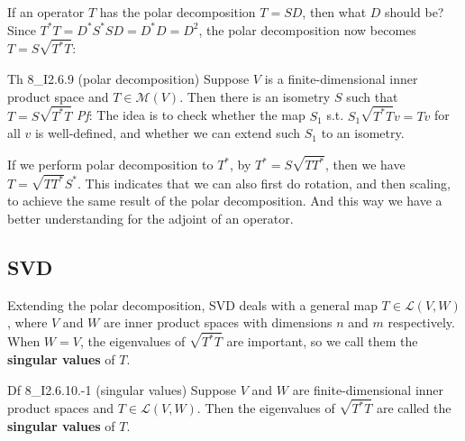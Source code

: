 \documentclass{article}
\begin{document}
If an operator $T$ has the polar decomposition $T = SD$, then what $D$ should be? Since $T^\ast T = D^\ast S^\ast S D = D^\ast D = D^2$, the polar decomposition now becomes $T = S\sqrt{T^\ast T}$:

\begin{Th}{Th 8\_I2.6.9 (polar decomposition)}
    Suppose $V$ is a finite-dimensional inner product space and $T\in\mathcal{M}(V)$. Then there is an isometry $S$ such that
    $T = S\sqrt{T^\ast T}$
    \tcblower
    \textit{Pf}: The idea is to check whether the map $S_1$ s.t. $S_1\sqrt{T^\ast T}v = Tv$ for all $v$ is well-defined, and whether we can extend such $S_1$ to an isometry.
\end{Th}

If we perform polar decomposition to $T^\ast$, by $T^\ast = S\sqrt{TT^\ast}$, then we have $T = \sqrt{TT^\ast} S^\ast$. This indicates that we can also first do rotation, and then scaling, to achieve the same result of the polar decomposition. And this way we have a better understanding for the adjoint of an operator.

\subsection{SVD}
Extending the polar decomposition, SVD deals with a general map $T\in\mathcal{L}(V,W)$, where $V$ and $W$ are inner product spaces with dimensions $n$ and $m$ respectively. When $W = V$, the eigenvalues of $\sqrt{T^\ast T}$ are important, so we call them the \textbf{singular values} of $T$.

\begin{Df}{Df 8\_I2.6.10.-1 (singular values)}
    Suppose $V$ and $W$ are finite-dimensional inner product spaces and $T\in\mathcal{L}(V,W)$. Then the eigenvalues of $\sqrt{T^\ast T}$ are called the \textbf{singular values} of $T$.
\end{Df}
\end{document}
